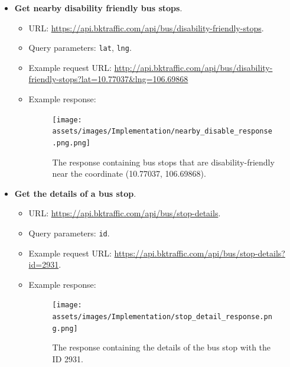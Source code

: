 \begin{itemize}
    \item \textbf{Get nearby disability friendly bus stops}.
    \begin{itemize}
        \item URL: \url{https://api.bktraffic.com/api/bus/disability-friendly-stops}.
        \item Query parameters: \lstinline{lat}, \lstinline{lng}.
        \item Example request URL: \url{http://api.bktraffic.com/api/bus/disability-friendly-stops?lat=10.77037&lng=106.69868}
        \item Example response:
        \begin{figure}[H]
            \texttt{[image: assets/images/Implementation/nearby\_disable\_response.png.png]}
            \caption{The response containing bus stops that are disability-friendly near the coordinate (10.77037, 106.69868).}
            \label{fig:nearby_disable_response}
        \end{figure}
    \end{itemize}

    \item \textbf{Get the details of a bus stop}.
    \begin{itemize}
        \item URL: \url{https://api.bktraffic.com/api/bus/stop-details}.
        \item Query parameters: \lstinline{id}.
        \item Example request URL: \url{https://api.bktraffic.com/api/bus/stop-details?id=2931}.
        \item Example response:
        \begin{figure}[H]
            \texttt{[image: assets/images/Implementation/stop\_detail\_response.png.png]}
            \caption{The response containing the details of the bus stop with the ID 2931.}
            \label{fig:stop_detail_response}
        \end{figure}
    \end{itemize}


\end{itemize}
